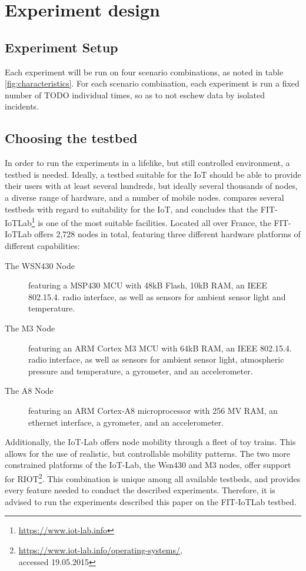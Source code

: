\documentclass{acm_proc_article-sp}
\begin{document}
\section{Experiment design}
\label{sec:Design}


\subsection{Experiment Setup}
\label{subsec:setup}
Each experiment will be run on four scenario combinations, as noted in table \ref{fig:characteristics}.
For each scenario combination, each experiment is run a fixed number of TODO individual times, so as to not eschew data by isolated incidents.

\subsection{Choosing the testbed}
\label{subsec:testbed_choice}

In order to run the experiments in a lifelike, but still controlled environment, a testbed is needed. Ideally, a testbed suitable for the IoT should be able to provide their users with at least several hundreds, but ideally several thousands of nodes, a diverse range of hardware, and a number of mobile nodes. \cite{testbed-survey} compares several testbeds with regard to suitability for the IoT, and concludes that the FIT-IoTLab\footnote{ \url{https://www.iot-lab.info}} is one of the most suitable facilities. Located all over France, the FIT-IoTLab offers 2,728 nodes in total, featuring three different hardware platforms of different capabilities:
\begin{description}
\item[The WSN430 Node] featuring a MSP430 MCU with 48kB Flash, 10kB RAM, an IEEE 802.15.4. radio interface, as well as sensors for ambient sensor light and temperature.
\item[The M3 Node] featuring an ARM Cortex M3 MCU with 64kB RAM, an IEEE 802.15.4. radio interface, as well as sensors for ambient sensor light, atmospheric pressure and temperature, a gyrometer, and an accelerometer.
\item[The A8 Node] featuring an ARM Cortex-A8 microprocessor with 256 MV RAM, an ethernet interface, a gyrometer, and an accelerometer.
\end{description}
Additionally, the IoT-Lab offers node mobility through a fleet of toy trains. This allows for the use of realistic, but controllable mobility patterns.
The two more constrained platforms of the IoT-Lab, the Wsn430 and M3 nodes, offer support for RIOT\cite{riot_poster}\footnote{ \url{https://www.iot-lab.info/operating-systems/}, \\accessed 19.05.2015}.
This combination is unique among all available testbeds, and provides every feature needed to conduct the described experiments. Therefore, it is advised to run the experiments described this paper on the FIT-IoTLab testbed.
\end{document}
